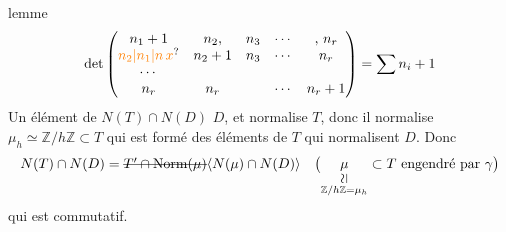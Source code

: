  lemme
\[
\det\begin{pmatrix}
n_1+1 & n_2, & n_3 & \cdots & ,\,n_r\\
\unsure{n_2|n_1|n\,x} & n_2+1 & n_3 & \cdots & n_r\\
\cdots & & & &\\
n_r & n_r & & \cdots & n_r+1
\end{pmatrix}=\sum n_i+1
\]
Un élément de $N(T)\cap N(D)$  $D$, et normalise $T$, donc il normalise \deleted{$\unsure{\mu}$} $\mu_h\simeq\mathbb Z/h\mathbb Z\subset T$ qui est formé des éléments de $T$ qui normalisent $D$. Donc
\[
N(T)\cap N(D)=\deleted{T'\cap\mathrm{Norm}(\mu)}\inserted{N(\mu)\cap N(D)}
\quad\bigl(\underset{\substack{\rotatebox{90}{$\simeq$}\\\mathbb Z/h\mathbb Z=\mu_h}}{\mu}\subset T\text{ engendré par }\gamma\bigr)
\]
\margin{\handwritten{$\unsure{=|--}$}}
 qui  est  commutatif.
\margin{\handwritten{$\big|$}}

